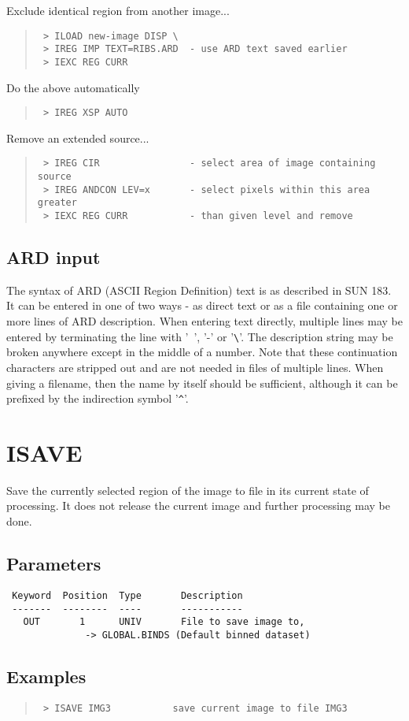 \documentclass{book}
\renewcommand{\_}{{\tt\char'137}}     %
\begin{document}
Exclude identical region from another image...
\begin{quote}\begin{verbatim}
 > ILOAD new-image DISP \
 > IREG IMP TEXT=RIBS.ARD  - use ARD text saved earlier
 > IEXC REG CURR
\end{verbatim}\end{quote}
Do the above automatically
\begin{quote}\begin{verbatim}
 > IREG XSP AUTO
\end{verbatim}\end{quote}
Remove an extended source...
\begin{quote}\begin{verbatim}
 > IREG CIR                - select area of image containing source
 > IREG ANDCON LEV=x       - select pixels within this area greater
 > IEXC REG CURR           - than given level and remove
\end{verbatim}\end{quote}
\subsection{ARD input}
The syntax of ARD (ASCII Region Definition) text is as described in
SUN 183. It can be entered in one of two ways - as direct text or
as a file containing one or more lines of ARD description. When
entering text directly, multiple lines may be entered by terminating
the line with '~', '-' or '\verb+\+'. The description string may be
broken anywhere except in the middle of a number. Note that these
continuation characters are stripped out and are not needed in files
of multiple lines. When giving a filename, then the name by itself
should be sufficient, although it can be prefixed by the indirection
symbol '\verb+^+'.

\section{ISAVE}
Save the currently selected region of the image to file in its
current state of processing. It does not release the current
image and further processing may be done.

\subsection{Parameters}
\begin{verbatim}
 Keyword  Position  Type       Description
 -------  --------  ----       -----------
   OUT       1      UNIV       File to save image to,
              -> GLOBAL.BINDS (Default binned dataset)

\end{verbatim}\subsection{Examples}
\begin{quote}\begin{verbatim}
 > ISAVE IMG3           save current image to file IMG3
 \end{verbatim}\end{quote}
\end{document}
